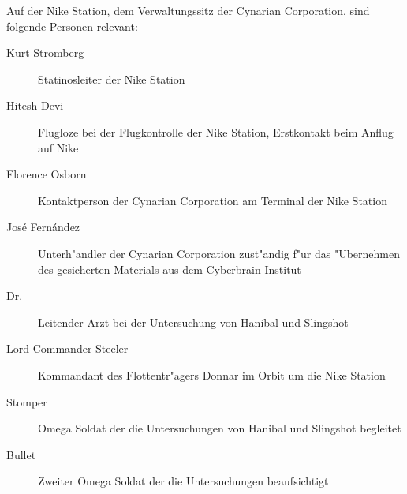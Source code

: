 
Auf der Nike Station, dem Verwaltungssitz der Cynarian Corporation, sind folgende Personen relevant:

\begin{description}
    \item [Kurt Stromberg] Statinosleiter der Nike Station
    \item [Hitesh Devi] Flugloze bei der Flugkontrolle der Nike Station, Erstkontakt beim Anflug auf Nike
    \item [Florence Osborn] Kontaktperson der Cynarian Corporation am Terminal der Nike Station
    \item [Jos\'e Fern\'andez] Unterh"andler der Cynarian Corporation zust"andig f"ur das "Ubernehmen des gesicherten 
        Materials aus dem Cyberbrain Institut
    \item [Dr.~ ] Leitender Arzt bei der Untersuchung von Hanibal und Slingshot
    \item [Lord Commander Steeler] Kommandant des Flottentr"agers Donnar im Orbit um die Nike Station
    \item [Stomper] Omega Soldat der die Untersuchungen von Hanibal und Slingshot begleitet
    \item [Bullet] Zweiter Omega Soldat der die Untersuchungen beaufsichtigt
\end{description}
